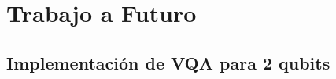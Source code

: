 \documentclass[letterpaper,12pt]{thesisECFM}
\theoremstyle{plain}
\theoremstyle{definition}
\theoremstyle{definition}
\theoremstyle{remark}
\newcommand{\1}{\mathbb{1}}
\begin{document}
\section{Trabajo a Futuro}
\subsection{Implementación de VQA para 2 qubits}
\appendix




\end{document}
